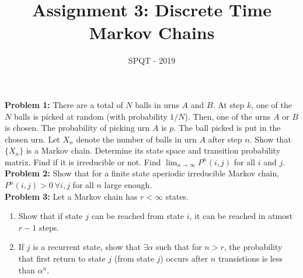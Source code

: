 \documentclass[a4paper,11pt,english]{article}
\title{Assignment 3: Discrete Time Markov Chains}
\author{SPQT - 2019}
\begin{document}
\maketitle
\textbf{Problem 1:} There are a total of $N$ balls in urns $A$ and $B$. At step $k$, one of the $N$ balls is picked at random (with probability $1/N$). Then, one of the urns $A$ or $B$ is chosen. The probability of picking urn $A$ is $p$. The ball picked is put in the chosen urn. Let $X_n$ denote the number of balls in urn $A$ after step $n$. Show that $\{X_n\}$ is a Markov chain. Determine its state space and transition probability matrix. Find if it is irreducible or not. Find $\lim_{n \rightarrow \infty} P^n(i,j)$ for all $i$ and $j$.\\
\indent \textbf{Problem 2:} Show that for a finite state aperiodic irreducible Markov chain, $P^n(i,j) > 0\  \forall i,j$ for all $n$ large enough.  \\
\indent \textbf{Problem 3:} Let a Markov chain has $r < \infty$ states. 
\begin{enumerate}
\item Show that if state $j$ can be reached from state $i$, it can be reached in atmost $r-1$ steps. 
\item If $j$ is a recurrent state, show that $\exists \alpha$ such that for $n>r$, the probability that first return to state $j$ (from state $j$) occurs after $n$ transistions is less than $\alpha^n$.
\end{enumerate} 
\end{document}
